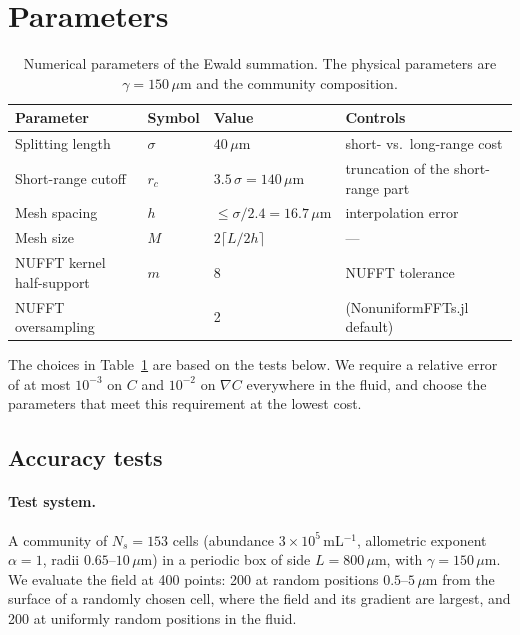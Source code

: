 \documentclass[11pt,a4paper]{article}
\newcommand{\um}{\,\mu\mathrm{m}}
\begin{document}
\section{Parameters}

\begin{table}[h]
  \centering\small
  \begin{tabular}{llll}
    \toprule
    Parameter & Symbol & Value & Controls \\
    \midrule
    Splitting length & $\sigma$ & $40\um$ & short- vs.\ long-range cost \\
    Short-range cutoff & $r_c$ & $3.5\,\sigma = 140\um$ & truncation of the short-range part \\
    Mesh spacing & $h$ & $\le \sigma/2.4 = 16.7\um$ & interpolation error \\
    Mesh size & $M$ & $2\lceil L/2h\rceil$ & --- \\
    NUFFT kernel half-support & $m$ & 8 & NUFFT tolerance \\
    NUFFT oversampling & & 2 & (NonuniformFFTs.jl default) \\
    \bottomrule
  \end{tabular}
  \caption{Numerical parameters of the Ewald summation. The physical parameters are
    $\gamma = 150\um$ and the community composition.}
  \label{tab:params}
\end{table}

The choices in Table~\ref{tab:params} are based on the tests below. We require a relative error of
at most $10^{-3}$ on $C$ and $10^{-2}$ on $\nabla C$ everywhere in the fluid, and choose the
parameters that meet this requirement at the lowest cost.

\subsection{Accuracy tests}

\paragraph{Test system.} A community of $N_s = 153$ cells (abundance $3\times10^5$\,mL$^{-1}$,
allometric exponent $\alpha=1$, radii $0.65$--$10\um$) in a periodic box of side $L = 800\um$, with
$\gamma = 150\um$. We evaluate the field at 400 points: 200 at random positions $0.5$--$5\um$ from
the surface of a randomly chosen cell, where the field and its gradient are largest, and 200 at
uniformly random positions in the fluid.
\end{document}
